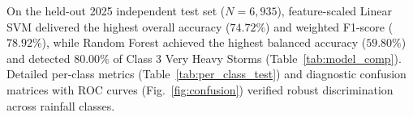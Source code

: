 \documentclass[conference]{IEEEtran}
\begin{document}
\begin{table}[!t]
\centering
\caption{Time Complexity and Space Complexity Analysis of Evaluated Algorithms}
\label{tab:complexity}
\end{table}

On the held-out 2025 independent test set ($N = 6{,}935$), feature-scaled Linear SVM delivered the highest overall accuracy ($74.72\%$) and weighted F1-score ($78.92\%$), while Random Forest achieved the highest balanced accuracy ($59.80\%$) and detected $80.00\%$ of Class 3 Very Heavy Storms (Table~\ref{tab:model_comp}). Detailed per-class metrics (Table~\ref{tab:per_class_test}) and diagnostic confusion matrices with ROC curves (Fig.~\ref{fig:confusion}) verified robust discrimination across rainfall classes.
\end{document}
